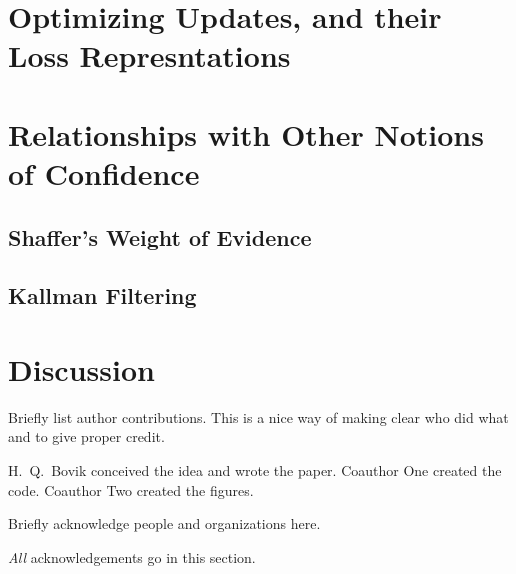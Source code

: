\documentclass{uai2023} %
\begin{document}
\section{Optimizing Updates, and their
    Loss Represntations} \label{sec:loss-repr}
% 

\section{Relationships with Other Notions of Confidence}
\subsection{Shaffer's Weight of Evidence}
\subsection{Kallman Filtering}

\section{Discussion}


\begin{contributions} %
    Briefly list author contributions.
    This is a nice way of making clear who did what and to give proper credit.

    H.~Q.~Bovik conceived the idea and wrote the paper.
    Coauthor One created the code.
    Coauthor Two created the figures.
\end{contributions}

\begin{acknowledgements} %
    Briefly acknowledge people and organizations here.

    \emph{All} acknowledgements go in this section.
\end{acknowledgements}

\ifbiblatex
    \printbibliography
\else
    
\fi

\appendix
\providecommand{\upGamma}{\Gamma}
\providecommand{\uppi}{\pi}
\end{document}
